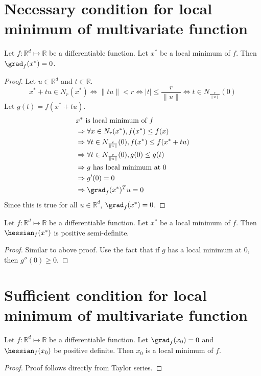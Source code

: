 \section{Necessary condition for local minimum of multivariate function}

\begin{theorem} Let $f: \mathbb{R}^d \mapsto \mathbb{R}$ be a differentiable function.
Let $x^*$ be a local minimum of $f$. Then $\grad_f(x^*) = 0$.
\end{theorem}
\begin{proof}
Let $u \in \mathbb{R}^d$ and $t \in \mathbb{R}$.
\[ x^* + tu \in N_r(x^*) \iff \|tu\| < r \iff |t| \le \frac{r}{\|u\|} \iff t \in N_{\frac{r}{\|u\|}}(0) \]
Let $g(t) = f(x^* + tu)$.
\begin{align*}
& x^* \textrm{ is local minimum of } f
\\ &\Rightarrow \forall x \in N_r(x^*), f(x^*) \le f(x)
\\ &\Rightarrow \forall t \in N_{\frac{r}{\|u\|}}(0), f(x^*) \le f(x^* + tu)
\\ &\Rightarrow \forall t \in N_{\frac{r}{\|u\|}}(0), g(0) \le g(t)
\\ &\Rightarrow g \textrm{ has local minimum at } 0
\\ &\Rightarrow g'(0) = 0
\\ &\Rightarrow \grad_f(x^*)^Tu = 0
\end{align*}
Since this is true for all $u \in \mathbb{R}^d$, $\grad_f(x^*) = 0$.
\end{proof}

\begin{theorem} Let $f: \mathbb{R}^d \mapsto \mathbb{R}$ be a differentiable function.
Let $x^*$ be a local minimum of $f$. Then $\hessian_f(x^*)$ is positive semi-definite.
\end{theorem}
\begin{proof}
Similar to above proof. Use the fact that if $g$ has a local minimum at 0, then $g''(0) \ge 0$.
\end{proof}

\section{Sufficient condition for local minimum of multivariate function}

\begin{theorem} Let $f: \mathbb{R}^d \mapsto \mathbb{R}$ be a differentiable function.
Let $\grad_f(x_0) = 0$ and $\hessian_f(x_0)$ be positive definite.
Then $x_0$ is a local minimum of $f$.
\end{theorem}
\begin{proof} Proof follows directly from Taylor series. \end{proof}


